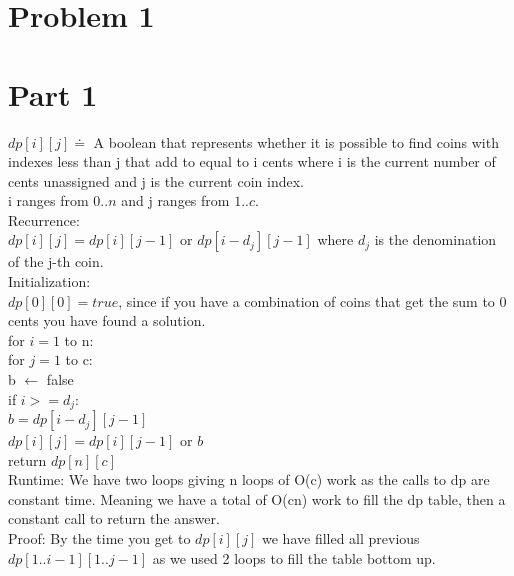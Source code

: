 \documentclass[11pt,letter]{article}
\newcommand{\2}{\{0, 1\}}
\newcommand{\1}{\mathds{1}}
\theoremstyle{definition}
\begin{document}
\section*{Problem 1}

\section*{Part 1}

$dp[i][j] \doteq$ A boolean that represents whether it is possible to find coins with indexes less than j that add to equal to i cents where i is the current number of cents unassigned and j is the current coin index. \\
i ranges from $0..n$ and j ranges from $1..c$.\\
 

Recurrence: \\
$dp[i][j] = dp[i][j-1]$ or $dp[i - d_j][j-1]$ where $d_j$ is the denomination of the j-th coin.\\

Initialization:\\
$dp[0][0] = true$, since if you have a combination of coins that get the sum to 0 cents you have found a solution.\\

for $i = 1$ to n:\\
\hspace*{3mm} for $j=1$ to c:\\
\hspace*{6mm} b $\leftarrow$ false\\
\hspace*{6mm} if $i >= d_j$: \\
\hspace*{9mm} $b = dp[i - d_j][j-1]$\\
\hspace*{6mm} $dp[i][j] = dp[i][j-1]$ or $b$\\

return $dp[n][c]$\\

Runtime: We have two loops giving n loops of O(c) work as the calls to dp are constant time. Meaning we have a total of O(cn) work to fill the dp table, then a constant call to return the answer.\\


Proof: By the time you get to $dp[i][j]$ we have filled all previous $dp[1..i-1][1..j-1]$ as we used 2 loops to fill the table bottom up.\\
\end{document}
